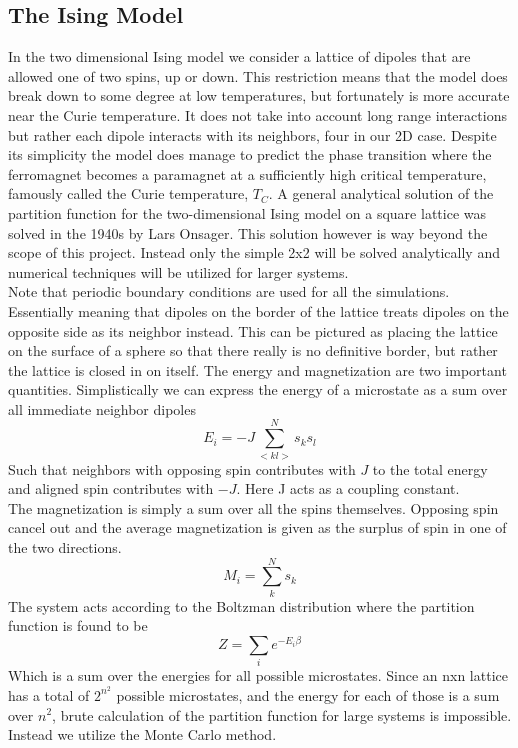 \documentclass[a4paper, 12pt]{article}
\begin{document}
{\subsection{The Ising Model}
	In the two dimensional Ising model we consider a lattice of dipoles that are allowed one of two spins, up or down. This restriction means that the model does break down to some degree at low temperatures, but fortunately is more accurate near the Curie temperature.\cite[p.~340]{schroeder} It does not take into account long range interactions but rather each dipole interacts with its neighbors, four in our 2D case. Despite its simplicity the model does manage to predict the phase transition where the ferromagnet becomes a paramagnet at a sufficiently high critical temperature, famously called the Curie temperature, $T_C$. A general analytical solution of the partition function for the two-dimensional Ising model on a square lattice was solved in the 1940s by Lars Onsager\cite[p.~343]{schroeder}. This solution however is way beyond the scope of this project. Instead only the simple 2x2 will be solved analytically and numerical techniques will be utilized for larger systems.\\
	Note that periodic boundary conditions are used for all the simulations. Essentially meaning that dipoles on the border of the lattice treats dipoles on the opposite side as its neighbor instead. This can be pictured as placing the lattice on the surface of a sphere so that there really is no definitive border, but rather the lattice is closed in on itself. 
	The energy and magnetization are two important quantities. Simplistically we can express the energy of a microstate as a sum over all immediate neighbor dipoles
	\begin{equation}\label{eq:energy}
		E_i = -J\sum_{<kl>}^N s_k s_l
	\end{equation}
	Such that neighbors with opposing spin contributes with $J$ to the total energy and aligned spin contributes with $-J$. Here J acts as a coupling constant.\\
	The magnetization is simply a sum over all the spins themselves. Opposing spin cancel out and the average magnetization is given as the surplus of spin in one of the two directions.
	\begin{equation}
		M_i = \sum_k^N s_k
	\end{equation}
	The system acts according to the Boltzman distribution where the partition function is found to be
	\begin{equation}
		Z = \sum_ie^{-E_i\beta}
	\end{equation}
	Which is a sum over the energies for all possible microstates. Since an nxn lattice has a total of $2^{n^2}$ possible microstates, and the  energy for each of those is a sum over $n^2$, brute calculation of the partition function for large systems is impossible. Instead we utilize the Monte Carlo method.
}
\end{document}
